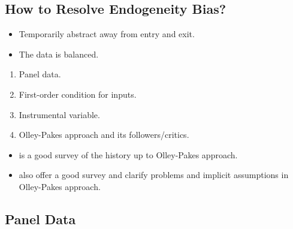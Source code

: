 \documentclass[]{book}
\providecommand{\tightlist}{%
  \setlength{\itemsep}{0pt}\setlength{\parskip}{0pt}}
\theoremstyle{definition}
\theoremstyle{definition}
\theoremstyle{definition}
\theoremstyle{remark}
\begin{document}
\subsection{How to Resolve Endogeneity
Bias?}\label{how-to-resolve-endogeneity-bias}

\begin{itemize}
\tightlist
\item
  Temporarily abstract away from entry and exit.
\item
  The data is balanced.
\end{itemize}

\begin{enumerate}
\def\labelenumi{\arabic{enumi}.}
\tightlist
\item
  Panel data.
\item
  First-order condition for inputs.
\item
  Instrumental variable.
\item
  Olley-Pakes approach and its followers/critics.
\end{enumerate}

\begin{itemize}
\tightlist
\item
  \citet{Griliches1998} is a good survey of the history up to
  Olley-Pakes approach.
\item
  \citet{Ackerberg2015} also offer a good survey and clarify problems
  and implicit assumptions in Olley-Pakes approach.
\end{itemize}

\subsection{Panel Data}\label{panel-data}
\end{document}

